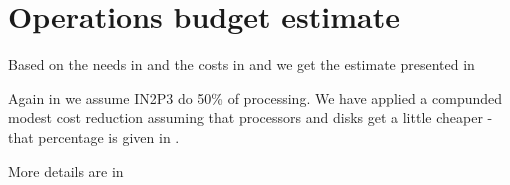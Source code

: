 \section{Operations budget estimate}\label{sec:cost}
Based on the needs in  and the costs in  and 
we get the estimate presented in 



Again in  we assume IN2P3 do 50\% of processing.
We have applied a compunded modest cost reduction assuming that processors  and disks get a little cheaper - that
percentage is given in .

More details are in 


